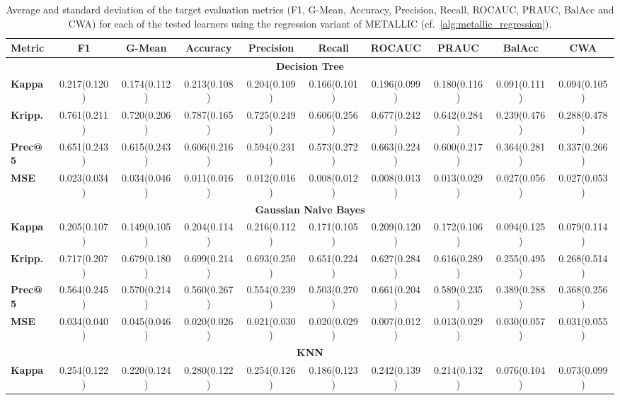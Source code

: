 \documentclass{article}
\begin{document}
\begin{sidewaystable}[!htbp]
\caption{Average and standard deviation of the target evaluation metrics (F1, G-Mean, Accuracy, Precision, Recall, ROCAUC, PRAUC, BalAcc and CWA) for each of the tested learners using the regression variant of METALLIC (cf.~\autoref{alg:metallic_regression}).}\label{tab:regression_scores}

\centering
\small
\begin{tabular}{@{}lccccccccc@{}}
\toprule
\textbf{Metric} & \textbf{F1} & \textbf{G-Mean} & \textbf{Accuracy} & \textbf{Precision} & \textbf{Recall} & \textbf{ROCAUC} & \textbf{PRAUC} & \textbf{BalAcc} & \textbf{CWA} \\
\midrule
\multicolumn{10}{c}{\textbf{Decision Tree}}\\
\midrule
\textbf{Kappa} & 0.217(0.120) & 0.174(0.112) & 0.213(0.108) & 0.204(0.109) & 0.166(0.101) & 0.196(0.099) & 0.180(0.116) & 0.091(0.111) & 0.094(0.105) \\
\textbf{Kripp.} & 0.761(0.211) & 0.720(0.206) & 0.787(0.165) & 0.725(0.249) & 0.606(0.256) & 0.677(0.242) & 0.642(0.284) & 0.239(0.476) & 0.288(0.478) \\
\textbf{Prec@5} & 0.651(0.243) & 0.615(0.243) & 0.606(0.216) & 0.594(0.231) & 0.573(0.272) & 0.663(0.224) & 0.600(0.217) & 0.364(0.281) & 0.337(0.266) \\
\textbf{MSE} & 0.023(0.034) & 0.034(0.046) & 0.011(0.016) & 0.012(0.016) & 0.008(0.012) & 0.008(0.013) & 0.013(0.029) & 0.027(0.056) & 0.027(0.053) \\
\midrule
\multicolumn{10}{c}{\textbf{Gaussian Naive Bayes}}\\
\midrule
\textbf{Kappa} & 0.205(0.107) & 0.149(0.105) & 0.204(0.114) & 0.216(0.112) & 0.171(0.105) & 0.209(0.120) & 0.172(0.106) & 0.094(0.125) & 0.079(0.114) \\
\textbf{Kripp.} & 0.717(0.207) & 0.679(0.180) & 0.699(0.214) & 0.693(0.250) & 0.651(0.224) & 0.627(0.284) & 0.616(0.289) & 0.255(0.495) & 0.268(0.514) \\
\textbf{Prec@5} & 0.564(0.245) & 0.570(0.214) & 0.560(0.267) & 0.554(0.239) & 0.503(0.270) & 0.661(0.204) & 0.589(0.235) & 0.389(0.288) & 0.368(0.256) \\
\textbf{MSE} & 0.034(0.040) & 0.045(0.046) & 0.020(0.026) & 0.021(0.030) & 0.020(0.029) & 0.007(0.012) & 0.013(0.029) & 0.030(0.057) & 0.031(0.055) \\
\midrule
\multicolumn{10}{c}{\textbf{KNN}}\\
\midrule
\textbf{Kappa} & 0.254(0.122) & 0.220(0.124) & 0.280(0.122) & 0.254(0.126) & 0.186(0.123) & 0.242(0.139) & 0.214(0.132) & 0.076(0.104) & 0.073(0.099) \\

\end{tabular}
\end{sidewaystable}
\end{document}
